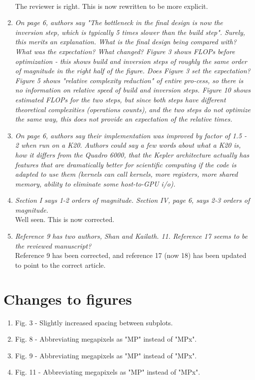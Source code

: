 \documentclass[11pt]{article} %
\newcommand\1{\vec 1}
\newcommand\q[1]{\textit{#1}}
\newcommand\qi[1]{\item\q{#1}}
\newcommand\ans[1]{#1}
\newcommand\ai[1]{\\[.5\baselineskip]\ans{#1}}
\begin{document}
\begin{enumerate}
\ai{The reviewer is right. This is now rewritten to be more explicit.}
%
\qi{On page 6, authors say "The bottleneck in the final design is now the inversion step, which is typically 5 times slower than the build step". Surely, this merits an explanation. What is the final design being compared with? What was the expectation? What changed? Figure 3 shows FLOPs before optimization - this shows build and inversion steps of roughly the same order of magnitude in the right half of the figure. Does Figure 3 set the expectation? Figure 5 shows "relative complexity reduction" of entire pro-cess, so there is no information on relative speed of build and inversion steps. Figure 10 shows estimated FLOPs for the two steps, but since both steps have different theoretical complexities (operations counts), and the two steps do not optimize the same way, this does not provide an expectation of the relative times.}
\qi{On page 6, authors say their implementation was improved by factor of 1.5 - 2 when run on a K20. Authors could say a few words about what a K20 is, how it differs from the Quadro 6000, that the Kepler architecture actually has features that are dramatically better for scientific computing if the code is adapted to use them (kernels can call kernels, more registers, more shared memory, ability to eliminate some host-to-GPU i/o).}
\qi{Section I says 1-2 orders of magnitude. Section IV, page 6, says 2-3 orders of magnitude.}
\ai{Well seen. This is now corrected.}
\qi{Reference 9 has two authors, Shan and Kailath. 11. Reference 17 seems to be the reviewed manuscript?}
\ai{Reference 9 has been corrected, and reference 17 (now 18) has been updated to point to the correct article. }
\end{enumerate}

\newpage
\section{Changes to figures}

\begin{enumerate}
\item Fig. 3 - Slightly increased spacing between subplots.
\item Fig. 8 - Abbreviating megapixels as "MP" instead of "MPx".
\item Fig. 9 - Abbreviating megapixels as "MP" instead of "MPx".
\item Fig. 11 - Abbreviating megapixels as "MP" instead of "MPx".
\end{enumerate}
\end{document}
